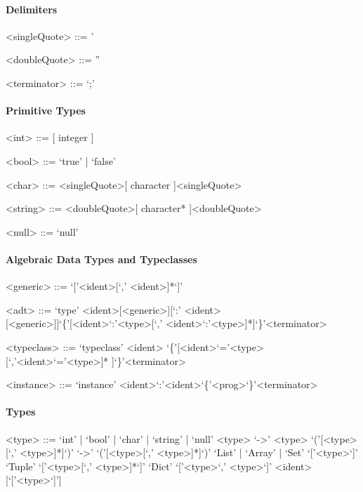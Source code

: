 \documentclass[11pt]{article} %
\begin{document}
\paragraph{Delimiters}

\begin{grammar}

<singleQuote> ::= '

<doubleQuote> ::= ''

<terminator> ::= `;'

\end{grammar}

\paragraph{Primitive Types}

\begin{grammar}

<int> ::= [ integer ]

<bool> ::= `true' | `false'

<char> ::= <singleQuote>[ character ]<singleQuote>

<string> ::= <doubleQuote>[ character* ]<doubleQuote>

<null> ::= `null'

\end{grammar}

\paragraph{Algebraic Data Types and Typeclasses}

\begin{grammar}

<generic> ::= `['<ident>[`,' <ident>]*`]'

<adt> ::= `type' <ident>[<generic>][`:' <ident>[<generic>]]`\{'[<ident>`:'<type>[`,' <ident>`:'<type>]*]`\}'<terminator>
 
<typeclass> ::= `typeclass' <ident> `\{'[<ident>`='<type>[`,'<ident>`='<type>]* ]`\}'<terminator>

<instance> ::= `instance' <ident>`:'<ident>`\{'<prog>`\}'<terminator>

\end{grammar}

\paragraph{Types}

\begin{grammar}

<type> ::= `int' | `bool' | `char' | `string' | `null'
\alt <type> `->' <type>
\alt `('[<type>[`,' <type>]*]`)' `->' `('[<type>[`,' <type>]*]`)'
\alt `List' | `Array' | `Set' `['<type>`]'
\alt `Tuple' `['<type>[`,' <type>]*`]'
\alt `Dict' `['<type>`,' <type>`]'
\alt <ident>[`['<type>`]']

\end{grammar}
\end{document}
